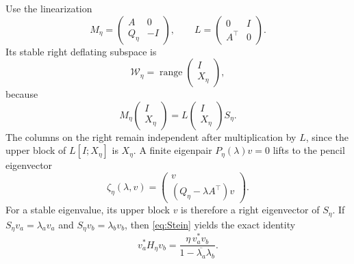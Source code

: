 \documentclass[11pt]{article}
\begin{document}
Use the linearization
\[
M_\eta=\begin{pmatrix}A&0\\Q_\eta&-I\end{pmatrix},
\qquad L=\begin{pmatrix}0&I\\A^\top&0\end{pmatrix}.
\]
Its stable right deflating subspace is
\begin{equation}\label{eq:graph}
\mathcal W_\eta=\operatorname{range}\begin{pmatrix}I\\X_\eta\end{pmatrix},
\end{equation}
because
\[
M_\eta\begin{pmatrix}I\\X_\eta\end{pmatrix}
=L\begin{pmatrix}I\\X_\eta\end{pmatrix}S_\eta.
\]
The columns on the right remain independent after multiplication by $L$, since the upper
block of $L[I;X_\eta]$ is $X_\eta$.
A finite eigenpair $P_\eta(\lambda)v=0$ lifts to the pencil eigenvector
\begin{equation}\label{eq:lift}
\zeta_\eta(\lambda,v)=\begin{pmatrix}v\\(Q_\eta-\lambda A^\top)v\end{pmatrix}.
\end{equation}
For a stable eigenvalue, its upper block $v$ is therefore a right eigenvector of $S_\eta$.
If $S_\eta v_a=\lambda_a v_a$ and $S_\eta v_b=\lambda_b v_b$, then
\eqref{eq:Stein} yields the exact identity
\begin{equation}\label{eq:kernel}
v_a^*H_\eta v_b=\frac{\eta\,v_a^*v_b}{1-\overline{\lambda_a}\lambda_b}.
\end{equation}
\end{document}
